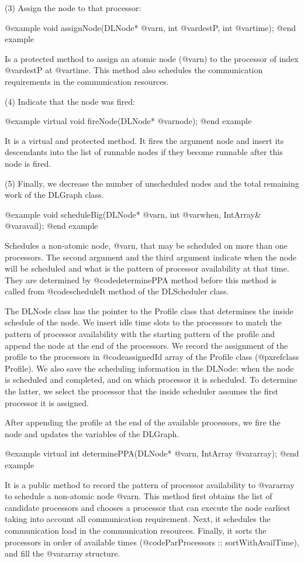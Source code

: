 (3) Assign the node to that processor:

@example
void assignNode(DLNode* @var{n}, int @var{destP}, int @var{time});
@end example

Is a protected method to assign an atomic node (@var{n}) to the processor
of index @var{destP} at @var{time}. This method also schedules the
communication requirements in the communication resources.

(4) Indicate that the node was fired:

@example
virtual void fireNode(DLNode* @var{node});
@end example

It is a virtual and protected method. It fires the argument node and insert
its descendants into the list of runnable nodes if they become runnable 
after this node is fired.

(5) Finally, we decrease the number of unscheduled nodes and the total
remaining work of the DLGraph class.

@example
void scheduleBig(DLNode* @var{n}, int @var{when}, IntArray& @var{avail});
@end example

Schedules a non-atomic node, @var{n}, that may be scheduled on more than one
processors. The second argument and the third argument indicate when the
node will be scheduled and what is the pattern of processor availability at
that time. They are determined by @code{determinePPA} method before this
method is called from @code{scheduleIt} method of the DLScheduler class.

The DLNode class has the pointer to the Profile class that determines the
inside schedule of the node. We insert idle time slots to the
processors to match the pattern of processor availability with the starting
pattern of the profile and append the node at the end of the processors. 
We record the assignment of the profile to
the processors in @code{assignedId} array of the Profile class
(@pxref{class Profile}). We also save the scheduling information in the
DLNode: when the node is scheduled and completed, and on which processor
it is scheduled. To determine the latter, we select the processor that
the inside scheduler assumes the first processor it is assigned.

After appending the profile at the end of the available processors, we
fire the node and updates the variables of the DLGraph.

@example
virtual int determinePPA(DLNode* @var{n}, IntArray @var{array});
@end example

It is a public method to record the pattern of processor availability to
@var{array} to schedule a non-atomic node @var{n}.
This method first obtains the list of candidate processors and chooses
a processor that can execute the node earliest taking into account
all communication requirement. Next, it schedules the communication 
load in the communication resources. Finally, it sorts the processors
in order of available times (@code{ParProcessors :: sortWithAvailTime}), and
fill the @var{array} structure.

